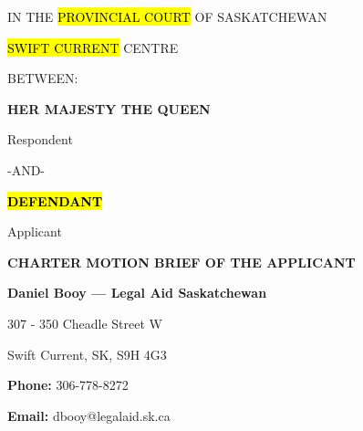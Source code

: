 \thispagestyle{empty}
\centering
IN THE \hl{PROVINCIAL COURT} OF SASKATCHEWAN

\hl{SWIFT CURRENT} CENTRE

\raggedright
\hfill \break
BETWEEN:
\hfill \break


\centering

\textbf{HER MAJESTY THE QUEEN}

\hfill \break

\raggedleft

Respondent

\centering
-AND- 

\hfill \break

\textbf{\hl{DEFENDANT}}

\raggedleft

\hfill \break

Applicant

\hfill \break

\hrulefill
\break
\centering

\textbf{CHARTER MOTION BRIEF OF THE APPLICANT}
\break

\hrulefill

\hfill \break

\textbf{Daniel Booy — Legal Aid Saskatchewan}

307 - 350 Cheadle Street W

Swift Current, SK, S9H 4G3

\textbf{Phone:} 306-778-8272

\textbf{Email:} dbooy@legalaid.sk.ca